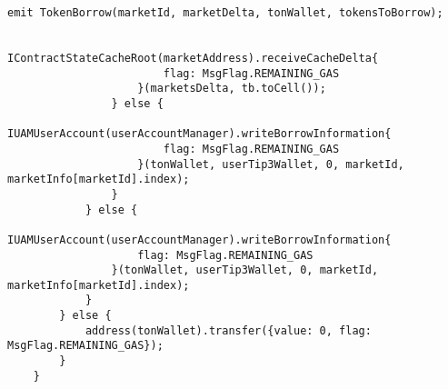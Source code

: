 \begin{lstlisting}[firstnumber=74]
                    emit TokenBorrow(marketId, marketDelta, tonWallet, tokensToBorrow);

                    IContractStateCacheRoot(marketAddress).receiveCacheDelta{
                        flag: MsgFlag.REMAINING_GAS
                    }(marketsDelta, tb.toCell());
                } else {
                    IUAMUserAccount(userAccountManager).writeBorrowInformation{
                        flag: MsgFlag.REMAINING_GAS
                    }(tonWallet, userTip3Wallet, 0, marketId, marketInfo[marketId].index);
                }
            } else {
                IUAMUserAccount(userAccountManager).writeBorrowInformation{
                    flag: MsgFlag.REMAINING_GAS
                }(tonWallet, userTip3Wallet, 0, marketId, marketInfo[marketId].index);
            }
        } else {
            address(tonWallet).transfer({value: 0, flag: MsgFlag.REMAINING_GAS});
        }
    }
\end{lstlisting}


